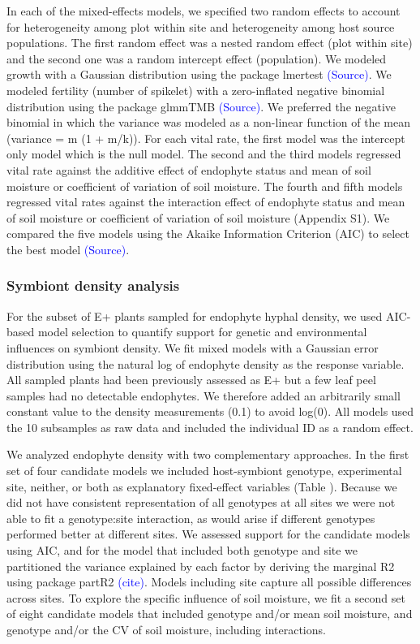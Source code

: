 \documentclass[11pt]{article}
\begin{document}
In each of the mixed-effects models, we specified two random effects to account for heterogeneity among plot within site and heterogeneity among host source populations. The first random effect was a nested random effect (plot within site) and the second one was a random intercept effect (population). We modeled growth with a Gaussian distribution using the package lmertest  \textcolor{blue}{(Source)}. We modeled fertility (number of spikelet) with a zero-inflated negative binomial distribution using the package glmmTMB  \textcolor{blue}{(Source)}. We preferred the negative binomial in which the variance was modeled as a non-linear function of the mean (variance = m (1 + m/k)). For each vital rate, the first model was the intercept only model which is the null model. The second and the third models regressed vital rate against the additive effect of endophyte status and mean of soil moisture or coefficient of variation of soil moisture. The fourth and fifth models regressed vital rates against the interaction effect of endophyte status and mean of soil moisture or coefficient of variation of soil moisture (Appendix S1). We compared the five models using the Akaike Information Criterion (AIC) to select the best model \textcolor{blue}{(Source)}. 

\subsubsection* {Symbiont density analysis}
For the subset of E+ plants sampled for endophyte hyphal density, we used AIC-based model selection to quantify support for genetic and environmental influences on symbiont density. We fit mixed models with a Gaussian error distribution using the natural log of endophyte density as the response variable. All sampled plants had been previously assessed as E+ but a few leaf peel samples had no detectable endophytes. We therefore added an arbitrarily small constant value to the density measurements (0.1) to avoid log(0). All models used the 10 subsamples as raw data and included the individual ID as a random effect. 

We analyzed endophyte density with two complementary approaches. In the first set of four candidate models we included host-symbiont genotype, experimental site, neither, or both as explanatory fixed-effect variables (Table ). Because we did not have consistent representation of all genotypes at all sites we were not able to fit a genotype:site interaction, as would arise if different genotypes performed better at different sites. We assessed support for the candidate models using AIC, and for the model that included both genotype and site we partitioned the variance explained by each factor by deriving the marginal R2 using package partR2 \textcolor{blue}{(cite)}. Models including site capture all possible differences across sites. To explore the specific influence of soil moisture, we fit a second set of eight candidate models that included genotype and/or mean soil moisture, and genotype and/or the CV of soil moisture, including interactions. 
\end{document}
